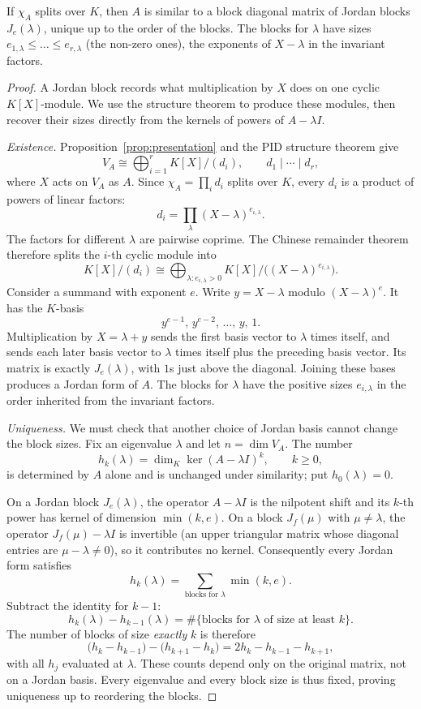 \begin{theorem}\label{thm:jordan}
If $\chi_A$ splits over $K$, then $A$ is similar to a block diagonal matrix of Jordan blocks $J_{e}(\lambda)$, unique up to the order of the blocks. The blocks for $\lambda$ have sizes $e_{1,\lambda}\le\dots\le e_{r,\lambda}$ (the non-zero ones), the exponents of $X-\lambda$ in the invariant factors.
\end{theorem}
\begin{proof}
A Jordan block records what multiplication by $X$ does on one cyclic
$K[X]$-module. We use the structure theorem to produce these modules, then
recover their sizes directly from the kernels of powers of $A-\lambda I$.

\emph{Existence.}
Proposition~\ref{prop:presentation} and the PID structure theorem give
\[
V_A\cong\bigoplus_{i=1}^r K[X]/(d_i),
\qquad d_1\mid\cdots\mid d_r,
\]
where $X$ acts on $V_A$ as $A$. Since $\chi_A=\prod_i d_i$ splits over
$K$, every $d_i$ is a product of powers of linear factors:
\[
d_i=\prod_{\lambda}(X-\lambda)^{e_{i,\lambda}}.
\]
The factors for different $\lambda$ are pairwise coprime. The Chinese
remainder theorem therefore splits the $i$-th cyclic module into
\[
K[X]/(d_i)\cong
\bigoplus_{\lambda:e_{i,\lambda}>0}
K[X]/\bigl((X-\lambda)^{e_{i,\lambda}}\bigr).
\]
Consider a summand with exponent $e$. Write $y=X-\lambda$ modulo
$(X-\lambda)^e$. It has the $K$-basis
\[
y^{e-1},\,y^{e-2},\,\dots,\,y,\,1.
\]
Multiplication by $X=\lambda+y$ sends the first basis vector to $\lambda$
times itself, and sends each later basis vector to $\lambda$ times
itself plus the preceding basis vector. Its matrix is exactly
$J_e(\lambda)$, with $1$s just above the diagonal. Joining these bases
produces a Jordan form of $A$. The blocks for $\lambda$ have the
positive sizes $e_{i,\lambda}$ in the order inherited from the
invariant factors.

\emph{Uniqueness.}
We must check that another choice of Jordan basis cannot change the
block sizes. Fix an eigenvalue $\lambda$ and let $n=\dim V_A$. The
number
\[
h_k(\lambda)=\dim_K\ker(A-\lambda I)^k,\qquad k\ge0,
\]
is determined by $A$ alone and is unchanged under similarity; put
$h_0(\lambda)=0$.

On a Jordan block $J_e(\lambda)$, the operator $A-\lambda I$ is the
nilpotent shift and its $k$-th power has kernel of dimension
$\min(k,e)$. On a block $J_f(\mu)$ with $\mu\ne\lambda$, the operator
$J_f(\mu)-\lambda I$ is invertible (an upper triangular matrix whose
diagonal entries are $\mu-\lambda\ne0$), so it contributes no kernel.
Consequently every Jordan form satisfies
\[
h_k(\lambda)=\sum_{\text{blocks for }\lambda}\min(k,e).
\]
Subtract the identity for $k-1$:
\[
h_k(\lambda)-h_{k-1}(\lambda)
=\#\{\text{blocks for }\lambda\text{ of size at least }k\}.
\]
The number of blocks of size \emph{exactly} $k$ is therefore
\[
\bigl(h_k-h_{k-1}\bigr)
-\bigl(h_{k+1}-h_k\bigr)
=2h_k-h_{k-1}-h_{k+1},
\]
with all $h_j$ evaluated at $\lambda$.
These counts depend only on the original matrix, not on a Jordan basis.
Every eigenvalue and every block size is thus fixed, proving uniqueness
up to reordering the blocks.


\end{proof}
